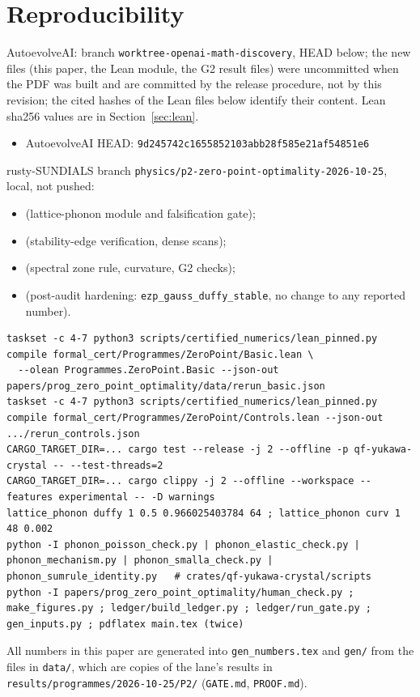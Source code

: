 \documentclass[10pt]{article}
\begin{document}
\section{Reproducibility}\label{sec:repro}
AutoevolveAI: branch \texttt{worktree-openai-math-discovery}, HEAD below; the new files (this paper, the Lean module, the G2 result files) were uncommitted when the PDF was built and are committed by the release procedure, not by this revision; the cited hashes of the Lean files below identify their content. Lean sha256 values are in Section~\ref{sec:lean}.
\begin{itemize}\scriptsize\itemsep=0pt\item AutoevolveAI HEAD: \texttt{9d245742c1655852103abb28f585e21af54851e6}\end{itemize}
rusty-SUNDIALS branch \texttt{physics/p2-zero-point-optimality-2026-10-25}, local, not pushed:
\begin{itemize}\scriptsize\itemsep=0pt
\item \texttt{\ZPRustyGate} (lattice-phonon module and falsification gate);
\item \texttt{\ZPRustyEdge} (stability-edge verification, dense scans);
\item \texttt{\ZPRustySpectral} (spectral zone rule, curvature, G2 checks);
\item \texttt{\ZPRustyHarden} (post-audit hardening: \texttt{ezp\_gauss\_duffy\_stable}, no change to any reported number).
\end{itemize}
\begin{lstlisting}[basicstyle=\ttfamily\scriptsize]
taskset -c 4-7 python3 scripts/certified_numerics/lean_pinned.py compile formal_cert/Programmes/ZeroPoint/Basic.lean \
  --olean Programmes.ZeroPoint.Basic --json-out papers/prog_zero_point_optimality/data/rerun_basic.json
taskset -c 4-7 python3 scripts/certified_numerics/lean_pinned.py compile formal_cert/Programmes/ZeroPoint/Controls.lean --json-out .../rerun_controls.json
CARGO_TARGET_DIR=... cargo test --release -j 2 --offline -p qf-yukawa-crystal -- --test-threads=2
CARGO_TARGET_DIR=... cargo clippy -j 2 --offline --workspace --features experimental -- -D warnings
lattice_phonon duffy 1 0.5 0.966025403784 64 ; lattice_phonon curv 1 48 0.002
python -I phonon_poisson_check.py | phonon_elastic_check.py | phonon_mechanism.py | phonon_smalla_check.py | phonon_sumrule_identity.py   # crates/qf-yukawa-crystal/scripts
python -I papers/prog_zero_point_optimality/human_check.py ; make_figures.py ; ledger/build_ledger.py ; ledger/run_gate.py ; gen_inputs.py ; pdflatex main.tex (twice)
\end{lstlisting}
All numbers in this paper are generated into \texttt{gen\_numbers.tex} and \texttt{gen/} from the files in \texttt{data/}, which are copies of the lane's results in \texttt{results/programmes/2026-10-25/P2/} (\texttt{GATE.md}, \texttt{PROOF.md}).
\end{document}
